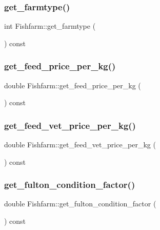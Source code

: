\subsubsection{\texorpdfstring{get\_farmtype()}{get\_farmtype()}}
{\footnotesize\ttfamily int Fishfarm\+::get\+\_\+farmtype (\begin{DoxyParamCaption}{ }\end{DoxyParamCaption}) const}

\mbox{\label{class_fishfarm_ab4c74d76a064d293c8f51481446ff5a9}} 
\subsubsection{\texorpdfstring{get\_feed\_price\_per\_kg()}{get\_feed\_price\_per\_kg()}}
{\footnotesize\ttfamily double Fishfarm\+::get\+\_\+feed\+\_\+price\+\_\+per\+\_\+kg (\begin{DoxyParamCaption}{ }\end{DoxyParamCaption}) const}

\mbox{\label{class_fishfarm_a8cd365afbb7bb3c4c9befb1014f7e1ce}} 
\subsubsection{\texorpdfstring{get\_feed\_vet\_price\_per\_kg()}{get\_feed\_vet\_price\_per\_kg()}}
{\footnotesize\ttfamily double Fishfarm\+::get\+\_\+feed\+\_\+vet\+\_\+price\+\_\+per\+\_\+kg (\begin{DoxyParamCaption}{ }\end{DoxyParamCaption}) const}

\mbox{\label{class_fishfarm_af1927ba5416b01ee61c764fa74398be4}} 
\subsubsection{\texorpdfstring{get\_fulton\_condition\_factor()}{get\_fulton\_condition\_factor()}}
{\footnotesize\ttfamily double Fishfarm\+::get\+\_\+fulton\+\_\+condition\+\_\+factor (\begin{DoxyParamCaption}{ }\end{DoxyParamCaption}) const}

